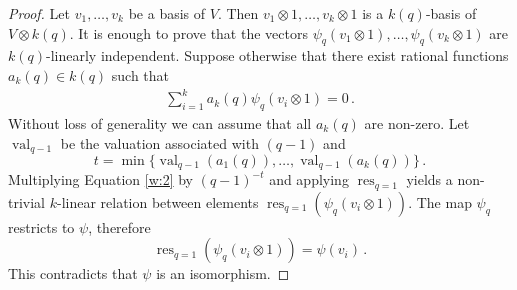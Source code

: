 \documentclass[10pt,a4paper]{amsart}
\newcommand{\res}{\operatorname{res}}
\newcommand{\val}{\operatorname{val}}
\begin{document}
\begin{proof}
	Let $v_1,\dots,v_k$ be a basis of $V$. Then $v_1\otimes 1,\dots,v_k\otimes 1$ is a $k(q)$-basis of $V\otimes k(q)$. It is enough to prove that the vectors $\psi_q(v_1\otimes 1),\dots,\psi_q(v_k\otimes 1)$ are $k(q)$-linearly independent. Suppose otherwise that there exist rational functions $a_k(q) \in k(q)$ such that
	\begin{align} \label{w:2}
		\sum_{i=1}^{k} a_k(q)\psi_q(v_i\otimes 1)=0\,. 
	\end{align}
	Without loss of generality we can assume that all $a_k(q)$ are non-zero. Let $\val_{q-1}$ be the valuation associated with $(q-1)$ and
	$$
	t=\min\{\val_{q-1}(a_1(q)), \dots, \val_{q-1}(a_k(q))\}\,.
	$$
	 Multiplying Equation \eqref{w:2} by $(q-1)^{-t}$ and applying $\res_{q=1}$ yields a non-trivial $k$-linear relation between elements $\res_{q=1}(\psi_q(v_i\otimes 1))$. The map $\psi_q$ restricts to  $\psi$, therefore $$\res_{q=1}(\psi_q(v_i\otimes 1))=\psi(v_i)\,.$$ This contradicts that $\psi$ is an  isomorphism.
\end{proof}
\end{document}
